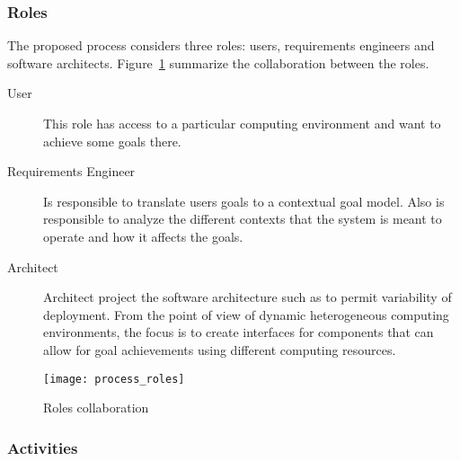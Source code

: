 %
%


\subsubsection{Roles}
The proposed process considers three roles: users, requirements engineers and software architects.
 Figure~\ref{fig:process_roles} summarize the collaboration between the roles.

\begin{description}
  \item[User]
  This role has access to a particular computing environment and want to achieve some goals there.
  \item[Requirements Engineer]
  Is responsible to translate users goals to a contextual goal model. Also is responsible to analyze the different contexts that the system is meant to operate and how it affects the goals.
  \item[Architect] Architect project the software architecture such as to permit variability of deployment.
  From the point of view of dynamic heterogeneous computing environments, the focus is to create interfaces for components that can allow for goal achievements using different computing resources.

\end{description}

\begin{figure}[!htb]
  \centering
  \texttt{[image: process\_roles]}
  \caption{Roles collaboration}
\label{fig:process_roles}
\end{figure}

\subsubsection{Activities}

